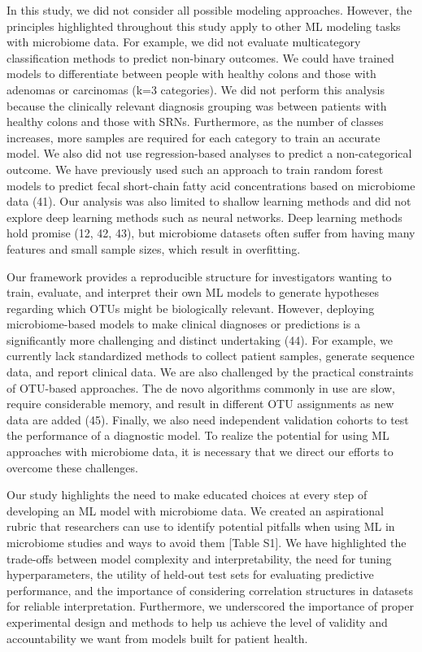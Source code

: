 \documentclass[11pt,]{article}
\begin{document}
In this study, we did not consider all possible modeling approaches.
However, the principles highlighted throughout this study apply to other
ML modeling tasks with microbiome data. For example, we did not evaluate
multicategory classification methods to predict non-binary outcomes. We
could have trained models to differentiate between people with healthy
colons and those with adenomas or carcinomas (k=3 categories). We did
not perform this analysis because the clinically relevant diagnosis
grouping was between patients with healthy colons and those with SRNs.
Furthermore, as the number of classes increases, more samples are
required for each category to train an accurate model. We also did not
use regression-based analyses to predict a non-categorical outcome. We
have previously used such an approach to train random forest models to
predict fecal short-chain fatty acid concentrations based on microbiome
data (41). Our analysis was also limited to shallow learning methods and
did not explore deep learning methods such as neural networks. Deep
learning methods hold promise (12, 42, 43), but microbiome datasets
often suffer from having many features and small sample sizes, which
result in overfitting.

Our framework provides a reproducible structure for investigators
wanting to train, evaluate, and interpret their own ML models to
generate hypotheses regarding which OTUs might be biologically relevant.
However, deploying microbiome-based models to make clinical diagnoses or
predictions is a significantly more challenging and distinct undertaking
(44). For example, we currently lack standardized methods to collect
patient samples, generate sequence data, and report clinical data. We
are also challenged by the practical constraints of OTU-based
approaches. The de novo algorithms commonly in use are slow, require
considerable memory, and result in different OTU assignments as new data
are added (45). Finally, we also need independent validation cohorts to
test the performance of a diagnostic model. To realize the potential for
using ML approaches with microbiome data, it is necessary that we direct
our efforts to overcome these challenges.

Our study highlights the need to make educated choices at every step of
developing an ML model with microbiome data. We created an aspirational
rubric that researchers can use to identify potential pitfalls when
using ML in microbiome studies and ways to avoid them {[}Table S1{]}. We
have highlighted the trade-offs between model complexity and
interpretability, the need for tuning hyperparameters, the utility of
held-out test sets for evaluating predictive performance, and the
importance of considering correlation structures in datasets for
reliable interpretation. Furthermore, we underscored the importance of
proper experimental design and methods to help us achieve the level of
validity and accountability we want from models built for patient
health.
\end{document}
